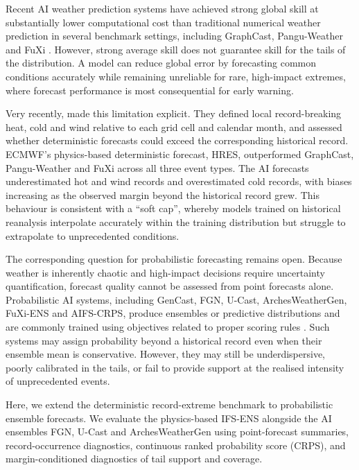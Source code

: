 \documentclass[11pt]{article}
\begin{document}
Recent AI weather prediction systems have achieved strong global skill at substantially lower computational cost than traditional numerical weather prediction in several benchmark settings, including GraphCast, Pangu-Weather and FuXi \citep{rasp2024weatherbench2,lam2023graphcast,bi2023pangu,chen2023fuxi}. However, strong average skill does not guarantee skill for the tails of the distribution. A model can reduce global error by forecasting common conditions accurately while remaining unreliable for rare, high-impact extremes, where forecast performance is most consequential for early warning.

Very recently, \citet{zhang2026recordextremes} made this limitation explicit. They defined local record-breaking heat, cold and wind relative to each grid cell and calendar month, and assessed whether deterministic forecasts could exceed the corresponding historical record. ECMWF's physics-based deterministic forecast, HRES, outperformed GraphCast, Pangu-Weather and FuXi across all three event types. The AI forecasts underestimated hot and wind records and overestimated cold records, with biases increasing as the observed margin beyond the historical record grew. This behaviour is consistent with a ``soft cap'', whereby models trained on historical reanalysis interpolate accurately within the training distribution but struggle to extrapolate to unprecedented conditions.

The corresponding question for probabilistic forecasting remains open. Because weather is inherently chaotic and high-impact decisions require uncertainty quantification, forecast quality cannot be assessed from point forecasts alone. Probabilistic AI systems, including GenCast, FGN, U-Cast, ArchesWeatherGen, FuXi-ENS and AIFS-CRPS, produce ensembles or predictive distributions and are commonly trained using objectives related to proper scoring rules \citep{price2025gencast,alet2026operational,ruhlingcachay2026ucast,couairon2026arches,zhong2025fuxiens,lang2026aifscrps}. Such systems may assign probability beyond a historical record even when their ensemble mean is conservative. However, they may still be underdispersive, poorly calibrated in the tails, or fail to provide support at the realised intensity of unprecedented events.

Here, we extend the deterministic record-extreme benchmark to probabilistic ensemble forecasts. We evaluate the physics-based IFS-ENS alongside the AI ensembles FGN, U-Cast and ArchesWeatherGen using point-forecast summaries, record-occurrence diagnostics, continuous ranked probability score (CRPS), and margin-conditioned diagnostics of tail support and coverage.
\end{document}
